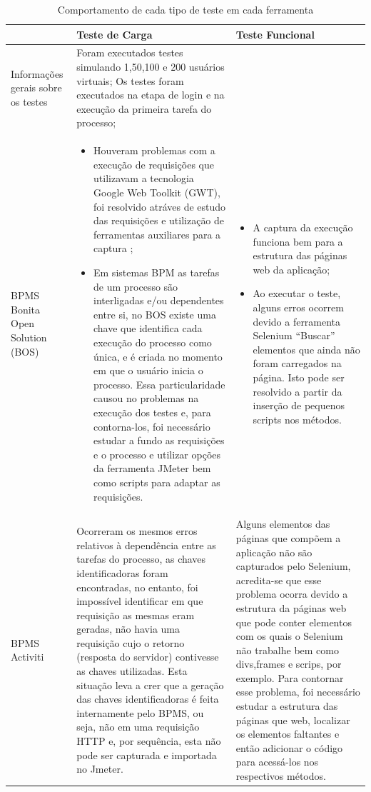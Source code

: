\documentclass[12pt]{article}
\begin{document}
\begin{table}
{\scriptsize
\centering
\begin{tabular}{|p{2cm}|p{7cm}|p{7cm}|}
  & Teste de Carga & Teste Funcional  \\\hline
Informações gerais sobre os testes & Foram executados testes simulando 1,50,100 e 200 usuários virtuais; Os testes foram executados na etapa de login e na execução da primeira tarefa do processo;
 &  \\\hline
BPMS Bonita Open Solution (BOS) & \begin{itemize}\item{Houveram problemas com a execução de requisições que utilizavam a tecnologia Google Web Toolkit (GWT), foi resolvido atráves de estudo das requisições e utilização de ferramentas auxiliares para a captura \cite{BLAZEMETER};}
\item{Em sistemas BPM as tarefas de um processo são interligadas e/ou dependentes entre si, no BOS existe uma chave que identifica cada execução do processo como única, e é criada no momento em que o usuário inicia o processo. Essa particularidade causou no problemas na execução dos testes e, para contorna-los, foi necessário estudar a fundo as requisições e o processo e utilizar opções da ferramenta JMeter bem como scripts para adaptar as requisições.}\end{itemize}
 & \begin{itemize} 
\item{A captura da execução funciona bem para a estrutura das páginas web da aplicação;}
\item{Ao executar o teste, alguns erros ocorrem devido a ferramenta Selenium “Buscar” elementos que ainda não foram carregados na página. Isto pode ser resolvido a partir da inserção de pequenos scripts nos métodos.}
 \end{itemize} \\\hline
BPMS Activiti & Ocorreram os mesmos erros relativos à dependência entre as tarefas do processo, as chaves identificadoras foram encontradas, no entanto, foi impossível identificar em que requisição as mesmas eram geradas, não havia uma requisição
cujo o retorno (resposta do servidor) contivesse as chaves utilizadas. Esta situação leva a crer
que a geração das chaves identificadoras é feita internamente pelo BPMS, ou seja, não em uma
requisição HTTP e, por sequência, esta não pode ser capturada e importada no Jmeter. & 
Alguns elementos das páginas que compõem a aplicação não são capturados pelo Selenium, acredita-se que esse problema ocorra devido a estrutura da páginas web que pode conter elementos com os quais o Selenium não trabalhe bem como divs,frames e
scrips, por exemplo. Para contornar esse problema, foi necessário estudar a estrutura das páginas que web, localizar os elementos faltantes e então adicionar o código para acessá-los nos respectivos métodos.\\\hline
\end{tabular}
}
\caption{Comportamento de cada tipo de teste em cada ferramenta}
\label{tab:bpms2}
\end{table}
\end{document}
